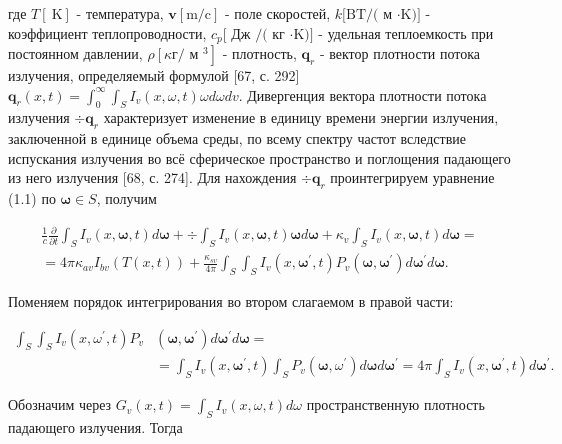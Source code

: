 \documentclass[10pt]{article}
\begin{document}
где $T[\mathrm{~K}]$ - температура, $\mathbf{v}[\mathrm{m} / \mathrm{c}]$ - поле скоростей, $k[\mathrm{BT} /($ м $\cdot \mathrm{K})]$ - коэффициент теплопроводности, $c_{p}[$ Дж $/($ кг $\cdot \mathrm{K})]$ - удельная теплоемкость при постоянном давлении, $\rho\left[\kappa г /\right.$ м $\left.^{3}\right]$ - плотность, $\mathbf{q}_{r}$ - вектор плотности потока излучения, определяемый формулой [67, с. 292] $\mathbf{q}_{r}(x, t)=\int_{0}^{\infty} \int_{S} I_{v}(x, \omega, t) \omega d \omega d v$. Дивергенция вектора плотности потока излучения $\div \mathbf{q}_{r}$ характеризует изменение в единицу времени энергии излучения, заключенной в единице объема среды, по всему спектру частот вследствие испускания излучения во всё сферическое пространство и поглощения падающего из него излучения [68, с. 274]. Для нахождения $\div \mathbf{q}_{r}$ проинтегрируем уравнение (1.1) по $\boldsymbol{\omega} \in S$, получим

$$
\begin{gathered}
\frac{1}{c} \frac{\partial}{\partial t} \int_{S} I_{v}(x, \boldsymbol{\omega}, t) d \boldsymbol{\omega}+\div \int_{S} I_{v}(x, \boldsymbol{\omega}, t) \boldsymbol{\omega} d \boldsymbol{\omega}+\kappa_{v} \int_{S} I_{v}(x, \boldsymbol{\omega}, t) d \boldsymbol{\omega}= \\
=4 \pi \kappa_{a v} I_{b v}(T(x, t))+\frac{\kappa_{s v}}{4 \pi} \int_{S} \int_{S} I_{v}\left(x, \boldsymbol{\omega}^{\prime}, t\right) P_{v}\left(\boldsymbol{\omega}, \boldsymbol{\omega}^{\prime}\right) d \boldsymbol{\omega}^{\prime} d \boldsymbol{\omega} .
\end{gathered}
$$

Поменяем порядок интегрирования во втором слагаемом в правой части:

$$
\begin{aligned}
\int_{S} \int_{S} I_{v}\left(x, \omega^{\prime}, t\right) P_{v} &\left(\boldsymbol{\omega}, \boldsymbol{\omega}^{\prime}\right) d \boldsymbol{\omega}^{\prime} d \boldsymbol{\omega}=\\
&=\int_{S} I_{v}\left(x, \boldsymbol{\omega}^{\prime}, t\right) \int_{S} P_{v}\left(\boldsymbol{\omega}, \omega^{\prime}\right) d \boldsymbol{\omega} d \boldsymbol{\omega}^{\prime}=4 \pi \int_{S} I_{v}\left(x, \boldsymbol{\omega}^{\prime}, t\right) d \boldsymbol{\omega}^{\prime} .
\end{aligned}
$$

Обозначим через $G_{v}(x, t)=\int_{S} I_{v}(x, \omega, t) d \omega$ пространственную плотность падающего излучения. Тогда
\end{document}
